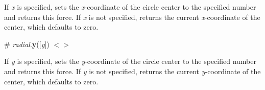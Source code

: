 If {\itshape x} is specified, sets the {\itshape x}-\/coordinate of the circle center to the specified number and returns this force. If {\itshape x} is not specified, returns the current {\itshape x}-\/coordinate of the center, which defaults to zero.

\label{_radial_y}%
\# {\itshape radial}.{\bfseries y}(\mbox{[}{\itshape y}\mbox{]}) \href{https://github.com/d3/d3-force/blob/master/src/radial.js}{\tt $<$$>$}

If {\itshape y} is specified, sets the {\itshape y}-\/coordinate of the circle center to the specified number and returns this force. If {\itshape y} is not specified, returns the current {\itshape y}-\/coordinate of the center, which defaults to zero. 